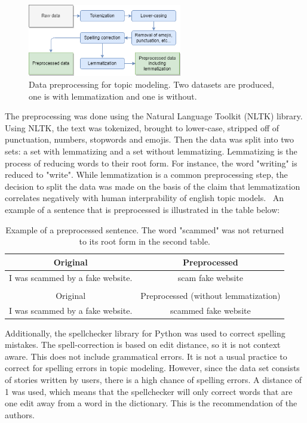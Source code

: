 \begin{figure}[h]
    \centering
    \includegraphics[width=0.6\textwidth]{resources/preprocessing_topic_modeling.png}
    \caption{Data preprocessing for topic modeling. Two datasets are produced, one is with lemmatization and one is without.}
    \label{fig:preprocessing_topic_modeling}
\end{figure}

The preprocessing was done using the Natural Language Toolkit (NLTK) library. Using NLTK, the text was tokenized, brought to lower-case, stripped off of punctuation, numbers, stopwords and emojis. Then the data was split into two sets: a set with lemmatizing and a set without lemmatizing. Lemmatizing is the process of reducing words to their root form. For instance, the word "writing" is reduced to "write". While lemmatization is a common preprocessing step, the decision to split the data was made on the basis of the claim that lemmatization correlates negatively with human interprability of english topic models.~\cite{schofield2016comparing} An example of a sentence that is preprocessed is illustrated in the table below:


\begin{table}[h]
    \centering
    \begin{tabular}{cc}
        Original & Preprocessed \\ \hline
        I was scammed by a fake website. & scam fake website \\
        \\
        Original & Preprocessed (without lemmatization) \\ \hline
        I was scammed by a fake website. & scammed fake website \\
    \end{tabular}
    \caption{Example of a preprocessed sentence. The word "scammed" was not returned to its root form in the second table.}
    \label{tab:preprocessing}
\end{table}

Additionally, the spellchecker library for Python was used to correct spelling mistakes. The spell-correction is based on edit distance, so it is not context aware. This does not include grammatical errors. It is not a usual practice to correct for spelling errors in topic modeling. However, since the data set consists of stories written by users, there is a high chance of spelling errors. A distance of 1 was used, which means that the spellchecker will only correct words that are one edit away from a word in the dictionary. This is the recommendation of the authors.~\cite{spellchecker2023}

